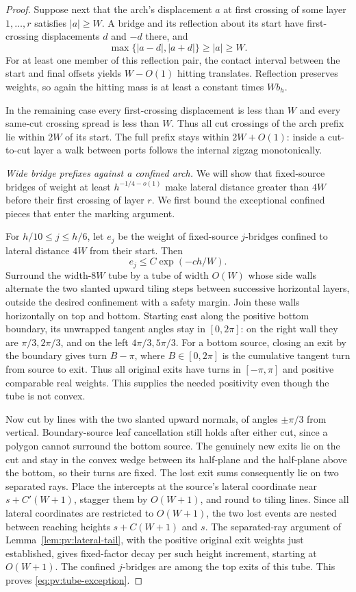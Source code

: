 \begin{proof}
Suppose next that the arch's displacement $a$ at first crossing of
some layer $1,\ldots,r$ satisfies $|a|\ge W$. A bridge and its
reflection about its start have first-crossing displacements $d$ and
$-d$ there, and
\[
 \max\{|a-d|,|a+d|\}\ge |a|\ge W.
\]
For at least one member of this reflection pair, the contact interval
between the start and final offsets yields $W-O(1)$ hitting
translates. Reflection preserves weights, so again the hitting mass
is at least a constant times $Wb_h$.

In the remaining case every first-crossing displacement is less than
$W$ and every same-cut crossing spread is less than $W$. Thus all
cut crossings of the arch prefix lie within $2W$ of its start.
The full prefix stays within $2W+O(1)$: inside a cut-to-cut layer a
walk between ports follows the internal zigzag monotonically.

\emph{Wide bridge prefixes against a confined arch.}
We will show that fixed-source bridges of weight at least
$h^{-1/4-o(1)}$ make lateral distance greater than $4W$ before their
first crossing of layer $r$. We first bound the exceptional confined
pieces that enter the marking argument.

For $h/10\le j\le h/6$, let $e_j$ be the weight of fixed-source
$j$-bridges confined to lateral distance $4W$ from their start. Then
\begin{equation}\label{eq:pv:tube-exception}
 e_j\le C\exp(-ch/W).
\end{equation}
Surround the width-$8W$ tube by a tube of width $O(W)$ whose side
walls alternate the two slanted upward tiling steps between successive
horizontal layers, outside the desired confinement with a safety
margin. Join these walls horizontally on top and bottom. Starting
east along the positive bottom boundary, its unwrapped tangent
angles stay in $[0,2\pi]$: on the right wall they are
$\pi/3,2\pi/3$, and on the left $4\pi/3,5\pi/3$. For a bottom
source, closing an exit by the boundary gives turn $B-\pi$, where
$B\in[0,2\pi]$ is the cumulative tangent turn from source to exit.
Thus all original exits have turns in $[-\pi,\pi]$ and positive
comparable real weights. This supplies the needed positivity even
though the tube is not convex.

Now cut by lines with the two slanted upward normals, of angles
$\pm\pi/3$ from vertical. Boundary-source leaf cancellation still
holds after either cut, since a polygon cannot surround the bottom
source. The genuinely new exits lie on the cut and stay in the convex
wedge between its half-plane and the half-plane above the bottom,
so their turns are fixed. The lost exit sums consequently lie on two
separated rays. Place the intercepts at the source's lateral
coordinate near $s+C'(W+1)$, stagger them by $O(W+1)$, and round to
tiling lines. Since all lateral coordinates are restricted to
$O(W+1)$, the two lost events are nested between reaching heights
$s+C(W+1)$ and $s$. The separated-ray argument of
Lemma~\ref{lem:pv:lateral-tail}, with the positive original exit
weights just established, gives fixed-factor decay per such height
increment, starting at $O(W+1)$. The confined $j$-bridges are among
the top exits of this tube. This proves
\eqref{eq:pv:tube-exception}.


\end{proof}
